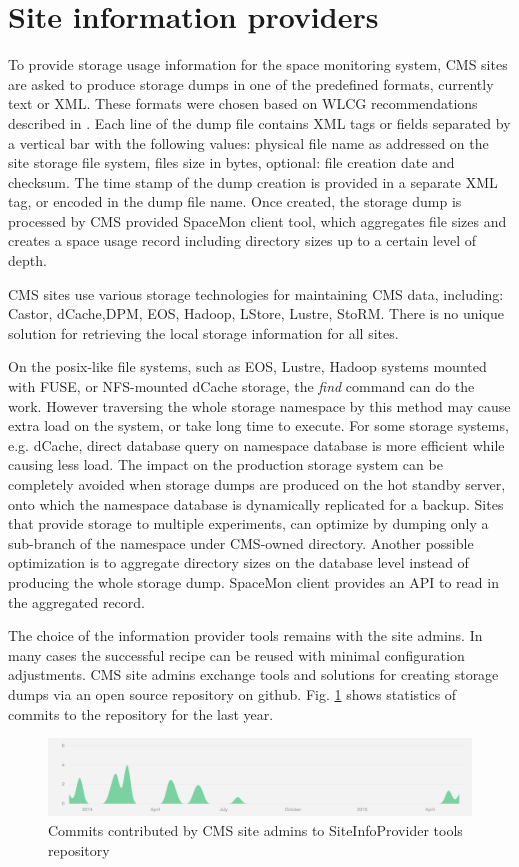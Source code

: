 \section {Site information providers}


To provide storage usage information for the space monitoring system, CMS sites 
are asked to produce storage dumps in one of the predefined formats, currently 
text or XML. These formats were chosen based on WLCG recommendations described 
in \cite{storagedumps}.  Each line of the dump file contains  XML  tags or fields 
separated by a vertical bar with the following values: physical file name as 
addressed on the site storage file system, files size in bytes, optional: 
file creation date and checksum. The time stamp of the dump creation is provided 
in a separate XML tag, or encoded in the dump file name.
Once created, the storage dump is processed by CMS provided SpaceMon client tool, 
which aggregates file sizes and creates a space usage record including directory 
sizes up to a certain level of depth. 

CMS sites use various storage technologies for maintaining CMS data, including:
Castor, dCache,DPM, EOS, Hadoop, LStore, Lustre, StoRM. There is no unique 
solution for retrieving the local storage information for all sites. 

On the posix-like file systems, such as EOS, Lustre, Hadoop systems mounted 
with FUSE, or NFS-mounted dCache storage, the {\it find} command can do the work.
However traversing the whole storage namespace by this method may cause extra 
load on the system, or take long time to execute. For some storage systems, 
e.g. dCache, direct database query on namespace database is more efficient
while causing less load. The impact on the production storage system can be
completely avoided when storage dumps are produced on the hot standby server, 
onto which the namespace database is dynamically replicated for a backup. 
Sites that provide storage to multiple experiments, can optimize by dumping 
only a sub-branch of the namespace under CMS-owned directory. 
Another possible optimization is to aggregate directory sizes on the database 
level instead of producing the whole storage dump. SpaceMon client provides 
an API to read in the aggregated record. 

The choice of the information provider tools remains with the site admins. 
In many cases the successful recipe can be reused with minimal configuration
adjustments. CMS site admins exchange tools and solutions for creating storage 
dumps via an open source repository on github. Fig. \ref{fig:github_stats} shows
statistics of commits to the repository for the last year. 

\begin{figure}[h]
\center
\includegraphics[width=1.0\linewidth]
{pictures/sites_contributions.pdf}
\caption{Commits contributed by CMS site admins to SiteInfoProvider tools repository}
\label{fig:github_stats}
\end{figure}

